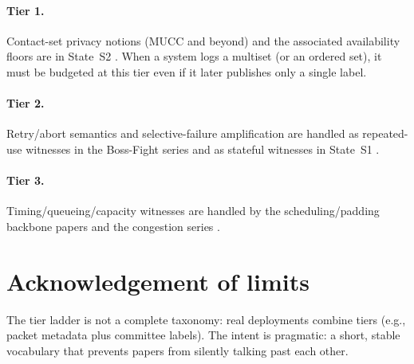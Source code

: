 \documentclass[11pt]{article}
\begin{document}
\paragraph{Tier 1.}
Contact-set privacy notions (MUCC and beyond) and the associated availability floors are in State~S2 \cite{series:state2}.
When a system logs a multiset (or an ordered set), it must be budgeted at this tier even if it later publishes only a single label.

\paragraph{Tier 2.}
Retry/abort semantics and selective-failure amplification are handled as repeated-use witnesses in the Boss-Fight series \cite{series:bossfightA,series:bossfightB} and as stateful witnesses in State~S1 \cite{series:state1}.

\paragraph{Tier 3.}
Timing/queueing/capacity witnesses are handled by the scheduling/padding backbone papers and the congestion series \cite{series:schedcompiler,series:congeq}.

\section*{Acknowledgement of limits}
The tier ladder is not a complete taxonomy: real deployments combine tiers (e.g., packet metadata plus committee labels).
The intent is pragmatic: a short, stable vocabulary that prevents papers from silently talking past each other.
\end{document}
